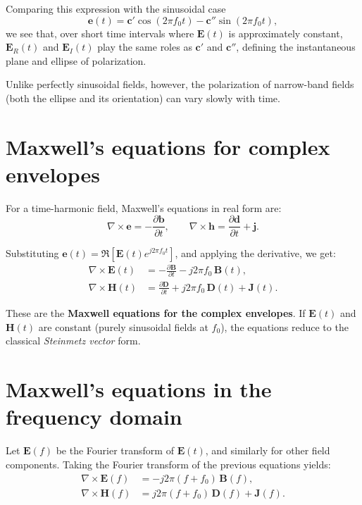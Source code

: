 Comparing this expression with the sinusoidal case
\[
\mathbf{e}(t) = \mathbf{c}'\cos(2\pi f_0 t) - \mathbf{c}''\sin(2\pi f_0 t),
\]
we see that, over short time intervals where $\mathbf{E}(t)$ is approximately constant,  
$\mathbf{E}_R(t)$ and $\mathbf{E}_I(t)$ play the same roles as $\mathbf{c}'$ and $\mathbf{c}''$, defining the instantaneous plane and ellipse of polarization.

Unlike perfectly sinusoidal fields, however, the polarization of narrow-band fields (both the ellipse and its orientation) can vary slowly with time.

\section{Maxwell’s equations for complex envelopes}

For a time-harmonic field, Maxwell’s equations in real form are:
\[
\nabla\times\mathbf{e} = -\frac{\partial\mathbf{b}}{\partial t}, 
\qquad
\nabla\times\mathbf{h} = \frac{\partial\mathbf{d}}{\partial t} + \mathbf{j}.
\]

Substituting $\mathbf{e}(t)=\Re[\mathbf{E}(t)e^{j2\pi f_0 t}]$, and applying the derivative, we get:
\begin{align}
    \nabla\times\mathbf{E}(t)
    &= -\frac{\partial\mathbf{B}}{\partial t} - j2\pi f_0\,\mathbf{B}(t),\\
    \nabla\times\mathbf{H}(t)
    &= \frac{\partial\mathbf{D}}{\partial t} + j2\pi f_0\,\mathbf{D}(t) + \mathbf{J}(t).
\end{align}

These are the \textbf{Maxwell equations for the complex envelopes}.  
If $\mathbf{E}(t)$ and $\mathbf{H}(t)$ are constant (purely sinusoidal fields at $f_0$), the equations reduce to the classical \emph{Steinmetz vector} form.

\section{Maxwell’s equations in the frequency domain}

Let $\mathbf{E}(f)$ be the Fourier transform of $\mathbf{E}(t)$, and similarly for other field components.  
Taking the Fourier transform of the previous equations yields:
\begin{align}
    \nabla\times\mathbf{E}(f) &= -j2\pi(f+f_0)\,\mathbf{B}(f),\\
    \nabla\times\mathbf{H}(f) &= j2\pi(f+f_0)\,\mathbf{D}(f) + \mathbf{J}(f).
\end{align}

